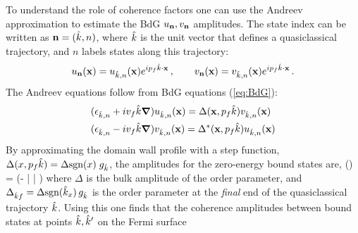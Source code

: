 \documentclass[prb,aps,showpacs,amsmath,twocolumn,10pt]{revtex4-1}
\newcommand{\sign}{\mbox{sgn}}
\begin{document}
To understand the role of coherence factors one can use the Andreev approximation to estimate the BdG
$u_{\bf n},v_{\bf n}$ amplitudes. 
The state index can be written as ${\bf n}=(\hat{k},n)$, where $\hat{k}$ is the unit vector that defines a quasiclassical
trajectory, and $n$ labels states along this trajectory:
$$
u_{\bf n}({\bf x}) = u_{\hat{k},n}({\bf x}) e^{ip_f \hat{k} \cdot {\bf x}}  \,,
\qquad
v_{\bf n}({\bf x}) = v_{\hat{k},n}({\bf x}) e^{ip_f \hat{k} \cdot {\bf x}}  \,.
$$
The Andreev equations follow from BdG equations (\ref{eq:BdG}): 
\begin{align}
\begin{split}
& (\epsilon_{\hat{k},n} + iv_f \hat{k}\mbox{\boldmath$\nabla$}) u_{\hat{k},n}({\bf x}) = \Delta({\bf x},p_f\hat{k}) v_{\hat{k},n}({\bf x}) 
\\
& (\epsilon_{\hat{k},n} - iv_f \hat{k}\mbox{\boldmath$\nabla$}) v_{\hat{k},n}({\bf x}) = \Delta^*({\bf x},p_f\hat{k}) u_{\hat{k},n}({\bf x}) 
\end{split}
\label{eq:Andreev}
\end{align}
By approximating the domain wall profile with a step function, 
$\Delta(x, p_f \hk) = \Delta \sign(x) \; g_{\hk}$,
the amplitudes for the zero-energy bound states are, 
\be
\label{eq:uv_andreev}
\left[ \begin{array}{c}
u_{\hk,n} \\ v_{\hk,n}
\end{array} \right] (\vx)
=  
\left[ \begin{array}{c}
1  \\ -i \; \sign(\Delta^*_{\hk f}) 
\end{array} \right] 
\exp\left(- \left|  \right| \right)
\ee
where $\Delta$ is the bulk amplitude of the order parameter, %
and $\Delta_{\hk f} = \Delta \sign(\hk_x) \, g_{\hk}$ 
is the order parameter at the \emph{final} end of the quasiclassical trajectory $\hat{k}$. 
Using this one finds that the coherence amplitudes
between bound states at points $\hat{k}, \hat{k}'$ on the Fermi surface 
\end{document}
